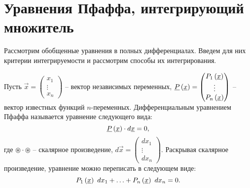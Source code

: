 \section{Уравнения Пфаффа, интегрирующий множитель}

	Рассмотрим обобщенные уравнения в полных дифференциалах. Введем для них критерии интегрируемости и рассмотрим способы их интегрирования.

	Пусть \( \vec{x} = \begin{pmatrix} x_1 \\ \vdots \\ x_n \end{pmatrix} \) -- вектор независимых переменных, \( \underline{P}\left( \underline{x} \right) = \begin{pmatrix} P_1\left( \underline{x} \right) \\ \vdots \\ P_n\left( \underline{x} \right) \end{pmatrix} \) -- вектор известных функций $n$-переменных. Дифференциальным уравнением Пфаффа называется уравнение следующего вида:
	\[ \underline{P}\left( \underline{x} \right) \cdot d\underline{x} = 0, \]
	где $\circledast \cdot \circledast$ -- скалярное произведение, \( d\vec{x} = \begin{pmatrix} dx_1 \\ \vdots \\ dx_n \end{pmatrix} \). Раскрывая скалярное произведение, уравнение можно переписать в следующем виде:
	\[ P_1\left( \underline{x} \right) ~ dx_1 + \ldots + P_n\left( \underline{x} \right) ~ dx_n = 0. \]

